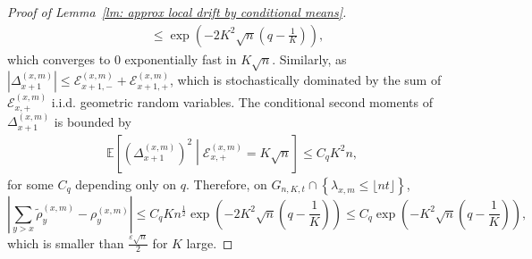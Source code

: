 \documentclass[twoside,12pt, a4paper]{article}
\numberwithin{equation}{section}
\theoremstyle{remark}
\newcommand{\abs}[1]{\left\vert #1 \right\vert}
\begin{document}
\begin{proof}[Proof of Lemma~\ref{lm: approx local drift by conditional means}]
\begin{align*}
			&\le \exp\left( - 2 K^2 \sqrt{n}(q - \frac{1}{K})  \right) 
			,
		\end{align*}
		which converges to $0$ exponentially fast in $K \sqrt{n}$. Similarly, as $\abs{\Delta_{x+1}^{(x,m)}} \leq  \mathcal{E}_{x+1,-}^{(x,m)} + \mathcal{E}_{x+1,+}^{(x,m)}$, which is stochastically dominated by the sum of $ \mathcal{E}_{x,+}^{(x,m)}$ i.i.d. geometric random variables.
		The conditional second moments of $ \Delta_{x+1}^{(x,m)} $ is bounded by 
		\begin{align*}
			\mathbb{E}\left[ \left(\Delta_{x+1}^{(x,m)}\right)^2 \middle| \mathcal{E}_{x,+}^{(x,m)} = K \sqrt{n}  \right] \leq  C_q K^2 n,
		\end{align*} for some $C_q$ depending only on $q$.
		Therefore, on $G_{n,K,t} \cap \left\{ \lambda_{x,m} \leq\lfloor nt \rfloor \right\}$,
		\begin{equation}\label{eq: difference of cond means}
		\left| \sum_{y > x} \tilde\rho_y^{(x,m)} - \rho_y^{(x,m)} \right| \le C_q K n^{\frac{1}{2}} \exp\left( - 2K^2 \sqrt{n}(q - \frac{1}{K}) \right) \leq  C_q\exp\left( - K^2 \sqrt{n}(q - \frac{1}{K}) \right), 
		\end{equation}
	which is smaller than $\frac{\varepsilon \sqrt{n}}{2}$ for $K$ large.
		
		
	

\end{proof}
\end{document}
